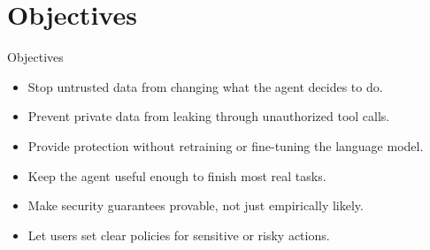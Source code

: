\documentclass[10pt]{beamer}
\begin{document}
\section{Objectives}
\begin{frame}{Objectives}
\begin{itemize}
  \item Stop untrusted data from changing what the agent decides to do.
  \item Prevent private data from leaking through unauthorized tool calls.
  \item Provide protection without retraining or fine-tuning the language model.
  \item Keep the agent useful enough to finish most real tasks.
  \item Make security guarantees provable, not just empirically likely.
  \item Let users set clear policies for sensitive or risky actions.
\end{itemize}
\end{frame}
\end{document}
